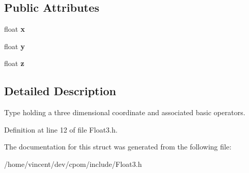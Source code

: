 \subsection*{Public Attributes}
\begin{DoxyCompactItemize}
\item 
float {\bfseries x}\hypertarget{structcpom_1_1_float3_a3a9570a39ae1444aec8b02a58419caa1}{}\label{structcpom_1_1_float3_a3a9570a39ae1444aec8b02a58419caa1}

\item 
float {\bfseries y}\hypertarget{structcpom_1_1_float3_acc6c4c5f8badf56a232fe3de4448197e}{}\label{structcpom_1_1_float3_acc6c4c5f8badf56a232fe3de4448197e}

\item 
float {\bfseries z}\hypertarget{structcpom_1_1_float3_ab83aefb317f7c526866a2ba87c961d90}{}\label{structcpom_1_1_float3_ab83aefb317f7c526866a2ba87c961d90}

\end{DoxyCompactItemize}


\subsection{Detailed Description}
Type holding a three dimensional coordinate and associated basic operators. 

Definition at line 12 of file Float3.\+h.



The documentation for this struct was generated from the following file\+:\begin{DoxyCompactItemize}
\item 
/home/vincent/dev/cpom/include/Float3.\+h\end{DoxyCompactItemize}
